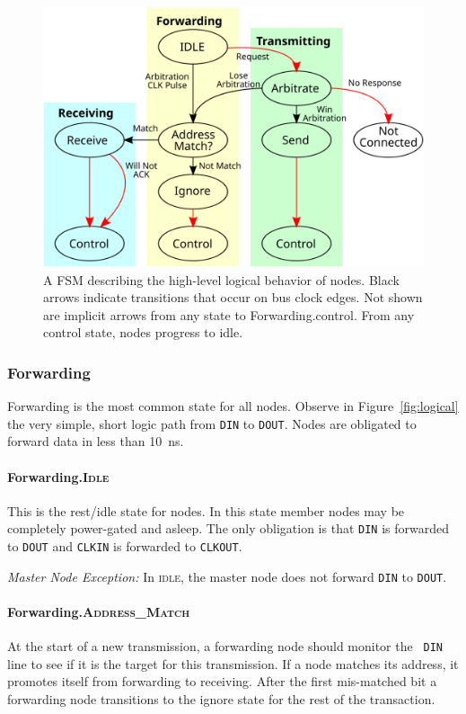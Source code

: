 \begin{figure}[h]
  \includegraphics[width=\linewidth]{img/fsm_diagram}
  \caption{A FSM describing the high-level logical behavior of \bus nodes.
    Black arrows indicate transitions that occur on bus clock edges. Not shown
    are implicit arrows from any state to Forwarding.{\sc control}. From any
    {\sc control} state, nodes progress to {\sc idle}.
    }
\end{figure}

\subsubsection{Forwarding}
Forwarding is the most common state for all \bus nodes.  Observe in
Figure~\ref{fig:logical} the very simple, short logic path from {\tt DIN} to
{\tt DOUT}. Nodes are obligated to forward data in less than 10~ns.

\paragraph{Forwarding.\textsc{Idle}}
This is the rest/idle state for \bus nodes. In this state member nodes may be
completely power-gated and asleep. The only obligation is that {\tt DIN} is
forwarded to {\tt DOUT} and {\tt CLKIN} is forwarded to {\tt CLKOUT}.

\medskip
\noindent
{\em Master Node Exception:} In \textsc{idle}, the master node does not
forward {\tt DIN} to {\tt DOUT}.

\paragraph{Forwarding.\textsc{Address\_Match}}
At the start of a new transmission, a forwarding node should monitor the {\tt
DIN} line to see if it is the target for this transmission. If a node matches
its address, it promotes itself from forwarding to receiving. After the first
mis-matched bit a forwarding node transitions to the {\sc ignore} state for
the rest of the transaction.

